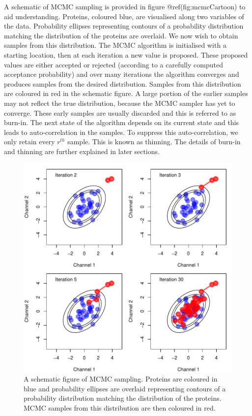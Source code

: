 \documentclass[
]{article}
\begin{document}
A schematic of MCMC sampling is provided in figure @ref(fig:mcmcCartoon)
to aid understanding. Proteins, coloured blue, are visualised along two
variables of the data. Probability ellipses representing contours of a
probability distribution matching the distribution of the proteins are
overlaid. We now wish to obtain samples from this distribution. The MCMC
algorithm is initialised with a starting location, then at each
iteration a new value is proposed. These proposed values are either
accepted or rejected (according to a carefully computed acceptance
probability) and over many iterations the algorithm converges and
produces samples from the desired distribution. Samples from this
distribution are coloured in red in the schematic figure. A large
portion of the earlier samples may not reflect the true distribution,
because the MCMC sampler has yet to converge. These early samples are
usually discarded and this is referred to as burn-in. The next state of
the algorithm depends on its current state and this leads to
auto-correlation in the samples. To suppress this auto-correlation, we
only retain every \(r^{th}\) sample. This is known as thinning. The
details of burn-in and thinning are further explained in later sections.

\begin{figure}
\centering
\includegraphics{F1000TAGMworkflow_rev1_files/figure-latex/mcmcCartoon-1.pdf}
\caption{A schematic figure of MCMC sampling. Proteins are coloured in
blue and probability ellipses are overlaid representing contours of a
probability distribution matching the distribution of the proteins. MCMC
samples from this distribution are then coloured in red.}
\end{figure}
\end{document}
